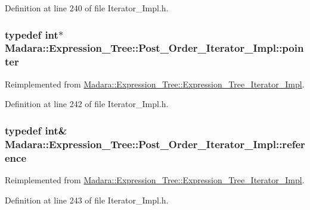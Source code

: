 Definition at line 240 of file Iterator\_\-Impl.h.

\hypertarget{classMadara_1_1Expression__Tree_1_1Post__Order__Iterator__Impl_a25a4fb605bf76c81f92b78de5fe9b5b3}{
\subsubsection[{pointer}]{\setlength{\rightskip}{0pt plus 5cm}typedef int$\ast$ {\bf Madara::Expression\_\-Tree::Post\_\-Order\_\-Iterator\_\-Impl::pointer}}}
\label{d4/d3e/classMadara_1_1Expression__Tree_1_1Post__Order__Iterator__Impl_a25a4fb605bf76c81f92b78de5fe9b5b3}


Reimplemented from \hyperlink{classMadara_1_1Expression__Tree_1_1Expression__Tree__Iterator__Impl_a33e128179eed32fd363d0f426ed313a1}{Madara::Expression\_\-Tree::Expression\_\-Tree\_\-Iterator\_\-Impl}.



Definition at line 242 of file Iterator\_\-Impl.h.

\hypertarget{classMadara_1_1Expression__Tree_1_1Post__Order__Iterator__Impl_abcfe99c7ecb45d8400b7a6a91b47827b}{
\subsubsection[{reference}]{\setlength{\rightskip}{0pt plus 5cm}typedef int\& {\bf Madara::Expression\_\-Tree::Post\_\-Order\_\-Iterator\_\-Impl::reference}}}
\label{d4/d3e/classMadara_1_1Expression__Tree_1_1Post__Order__Iterator__Impl_abcfe99c7ecb45d8400b7a6a91b47827b}


Reimplemented from \hyperlink{classMadara_1_1Expression__Tree_1_1Expression__Tree__Iterator__Impl_adbfbf382a07c981d136ea739c913aeab}{Madara::Expression\_\-Tree::Expression\_\-Tree\_\-Iterator\_\-Impl}.



Definition at line 243 of file Iterator\_\-Impl.h.

